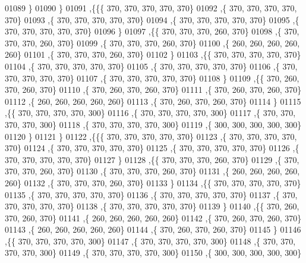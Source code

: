 \begin{DoxyCode}
01089    \}
01090   \}
01091  ,\{\{\{   370,   370,   370,   370,   370\}
01092    ,\{   370,   370,   370,   370,   370\}
01093    ,\{   370,   370,   370,   370,   370\}
01094    ,\{   370,   370,   370,   370,   370\}
01095    ,\{   370,   370,   370,   370,   370\}
01096    \}
01097   ,\{\{   370,   370,   370,   260,   370\}
01098    ,\{   370,   370,   370,   260,   370\}
01099    ,\{   370,   370,   370,   260,   370\}
01100    ,\{   260,   260,   260,   260,   260\}
01101    ,\{   370,   370,   370,   260,   370\}
01102    \}
01103   ,\{\{   370,   370,   370,   370,   370\}
01104    ,\{   370,   370,   370,   370,   370\}
01105    ,\{   370,   370,   370,   370,   370\}
01106    ,\{   370,   370,   370,   370,   370\}
01107    ,\{   370,   370,   370,   370,   370\}
01108    \}
01109   ,\{\{   370,   260,   370,   260,   370\}
01110    ,\{   370,   260,   370,   260,   370\}
01111    ,\{   370,   260,   370,   260,   370\}
01112    ,\{   260,   260,   260,   260,   260\}
01113    ,\{   370,   260,   370,   260,   370\}
01114    \}
01115   ,\{\{   370,   370,   370,   370,   300\}
01116    ,\{   370,   370,   370,   370,   300\}
01117    ,\{   370,   370,   370,   370,   300\}
01118    ,\{   370,   370,   370,   370,   300\}
01119    ,\{   300,   300,   300,   300,   300\}
01120    \}
01121   \}
01122  ,\{\{\{   370,   370,   370,   370,   370\}
01123    ,\{   370,   370,   370,   370,   370\}
01124    ,\{   370,   370,   370,   370,   370\}
01125    ,\{   370,   370,   370,   370,   370\}
01126    ,\{   370,   370,   370,   370,   370\}
01127    \}
01128   ,\{\{   370,   370,   370,   260,   370\}
01129    ,\{   370,   370,   370,   260,   370\}
01130    ,\{   370,   370,   370,   260,   370\}
01131    ,\{   260,   260,   260,   260,   260\}
01132    ,\{   370,   370,   370,   260,   370\}
01133    \}
01134   ,\{\{   370,   370,   370,   370,   370\}
01135    ,\{   370,   370,   370,   370,   370\}
01136    ,\{   370,   370,   370,   370,   370\}
01137    ,\{   370,   370,   370,   370,   370\}
01138    ,\{   370,   370,   370,   370,   370\}
01139    \}
01140   ,\{\{   370,   260,   370,   260,   370\}
01141    ,\{   260,   260,   260,   260,   260\}
01142    ,\{   370,   260,   370,   260,   370\}
01143    ,\{   260,   260,   260,   260,   260\}
01144    ,\{   370,   260,   370,   260,   370\}
01145    \}
01146   ,\{\{   370,   370,   370,   370,   300\}
01147    ,\{   370,   370,   370,   370,   300\}
01148    ,\{   370,   370,   370,   370,   300\}
01149    ,\{   370,   370,   370,   370,   300\}
01150    ,\{   300,   300,   300,   300,   300\}

\end{DoxyCode}
